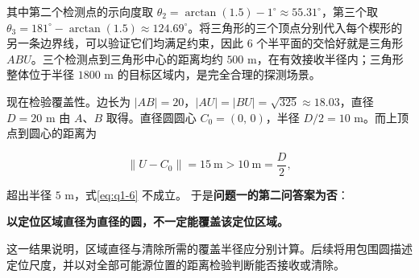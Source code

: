 其中第二个检测点的示向度取 $\theta_2=\arctan(1.5)-1^\circ\approx55.31^\circ$，第三个取 $\theta_3=181^\circ-\arctan(1.5)\approx124.69^\circ$。将三角形的三个顶点分别代入每个楔形的另一条边界线，可以验证它们均满足约束，因此 $6$ 个半平面的交恰好就是三角形 $ABU$。三个检测点到三角形中心的距离均约 $500$ m，在有效接收半径内；三角形整体位于半径 $1800$ m 的目标区域内，是完全合理的探测场景。


\begin{center}
\begin{minipage}{\linewidth}
\centering
\QOneCaseFigure
{}
\label{fig:q1-counterexample}
\end{minipage}
\end{center}



现在检验覆盖性。边长为 $|AB|=20$，$|AU|=|BU|=\sqrt{325}\approx18.03$，直径 $D=20$ m 由 $A$、$B$ 取得。直径圆圆心 $C_0=(0,\,0)$，半径 $D/2=10$ m。而上顶点到圆心的距离为

\[
\|U-C_0\|=15\ \text{m}>10\ \text{m}=\frac D2,
\]

超出半径 $5$ m，式\eqref{eq:q1-6} 不成立。
于是\textbf{问题一的第二问答案为否}：

\textbf{以定位区域直径为直径的圆，不一定能覆盖该定位区域。}



这一结果说明，区域直径与清除所需的覆盖半径应分别计算。后续将用包围圆描述定位尺度，并以对全部可能源位置的距离检验判断能否接收或清除。
